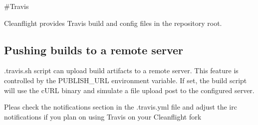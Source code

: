 \#\+Travis

Cleanflight provides Travis build and config files in the repository root.

\subsection*{Pushing builds to a remote server}

{\ttfamily .travis.\+sh} script can upload build artifacts to a remote server. This feature is controlled by the {\ttfamily P\+U\+B\+L\+I\+S\+H\+\_\+\+U\+R\+L} environment variable. If set, the build script will use the c\+U\+R\+L binary and simulate a file upload post to the configured server.

Pleas check the {\ttfamily notifications} section in the {\ttfamily .travis.\+yml} file and adjust the irc notifications if you plan on using Travis on your Cleanflight fork 